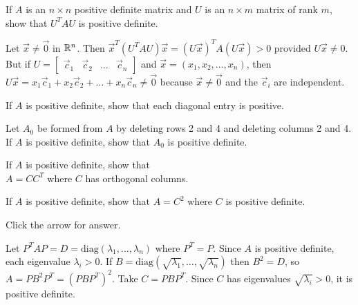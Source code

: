 \documentclass{ximera}
\begin{document}
\begin{problem}\label{prob:pos_def_6}
If $A$ is an $n \times n$ positive definite matrix and $U$ is an $n \times m$ matrix of rank $m$, show that $U^{T}AU$ is positive definite.

\begin{hint}
Let $\vec{x} \neq \vec{0}$ in $\mathbb{R}^n$. Then $\vec{x}^{T}(U^{T}AU)\vec{x} = (U\vec{x})^{T}A(U\vec{x}) > 0$ provided $U\vec{x} \neq 0$. But if $U = \left[ \begin{array}{cccc}
\vec{c}_{1} & \vec{c}_{2} & \dots &  \vec{c}_{n}
\end{array}\right]$ and $\vec{x} = (x_{1}, x_{2}, \dots, x_{n})$, then $U\vec{x} = x_{1}\vec{c}_{1} + x_{2}\vec{c}_{2} + \dots  + x_{n}\vec{c}_{n} \neq \vec{0}$ because $\vec{x} \neq \vec{0}$ and the $\vec{c}_{i}$ are independent.
\end{hint}
\end{problem}

\begin{problem}\label{prob:pos_def_7}
If $A$ is positive definite, show that each diagonal entry is positive.
\end{problem}

\begin{problem}\label{prob:pos_def_8}
Let $A_{0}$ be formed from $A$ by deleting rows 2 and 4 and deleting columns 2 and 4. If $A$ is positive definite, show that $A_{0}$ is positive definite.
\end{problem}

\begin{problem}\label{prob:pos_def_9}
If $A$ is positive definite, show that \\ $A = CC^{T}$ where $C$ has orthogonal columns.
\end{problem}

\begin{problem}\label{prob:pos_def_10}
If $A$ is positive definite, show that $A = C^{2}$ where $C$ is positive definite.

Click the arrow for answer.
\begin{expandable}
Let $P^{T}AP = D = \mbox{diag}(\lambda_{1}, \dots, \lambda_{n})$ where $P^{T} = P$. Since $A$ is positive definite, each eigenvalue $\lambda_{i} > 0$. If $B = \mbox{diag}(\sqrt{\lambda_{1}}, \dots, \sqrt{\lambda_{n}})$ then $B^{2} = D$, so $A = PB^{2}P^{T} = (PBP^{T})^{2}$. Take $C = PBP^{T}$. Since $C$ has eigenvalues $\sqrt{\lambda_{i}} > 0$, it is positive definite.
\end{expandable}
\end{problem}
\end{document}
